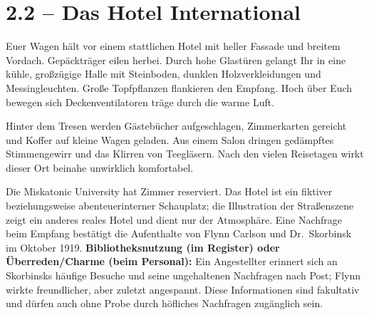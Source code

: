 \section{2.2 -- Das Hotel International}
\begin{vorlesetextalle}
Euer Wagen hält vor einem stattlichen Hotel mit heller Fassade und breitem Vordach. Gepäckträger eilen herbei. Durch hohe Glastüren gelangt Ihr in eine kühle, gro\ss{}zügige Halle mit Steinboden, dunklen Holzverkleidungen und Messingleuchten. Gro\ss{}e Topfpflanzen flankieren den Empfang. Hoch über Euch bewegen sich Deckenventilatoren träge durch die warme Luft.

Hinter dem Tresen werden Gästebücher aufgeschlagen, Zimmerkarten gereicht und Koffer auf kleine Wagen geladen. Aus einem Salon dringen gedämpftes Stimmengewirr und das Klirren von Teegläsern. Nach den vielen Reisetagen wirkt dieser Ort beinahe unwirklich komfortabel.
\end{vorlesetextalle}
\begin{meisterinfo}
Die Miskatonic University hat Zimmer reserviert. Das Hotel ist ein fiktiver beziehungsweise abenteuerinterner Schauplatz; die Illustration der Stra\ss{}enszene zeigt ein anderes reales Hotel und dient nur der Atmosphäre. Eine Nachfrage beim Empfang bestätigt die Aufenthalte von Flynn Carlson und Dr.~Skorbinsk im Oktober 1919. \textbf{Bibliotheksnutzung (im Register) oder Überreden/Charme (beim Personal):} Ein Angestellter erinnert sich an Skorbinsks häufige Besuche und seine ungehaltenen Nachfragen nach Post; Flynn wirkte freundlicher, aber zuletzt angespannt. Diese Informationen sind fakultativ und dürfen auch ohne Probe durch höfliches Nachfragen zugänglich sein.
\end{meisterinfo}


